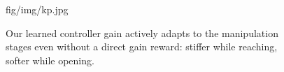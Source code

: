 \begin{figure}[ht]
\centering
\begin{overpic}
[width=0.95\linewidth]
{fig/img/kp.jpg}
\end{overpic}
\caption{Our learned controller gain actively adapts to the manipulation stages even without a direct gain reward: stiffer while reaching, softer while opening.}
\vspace{-0.5cm}
\label{fig:kp}
\end{figure}